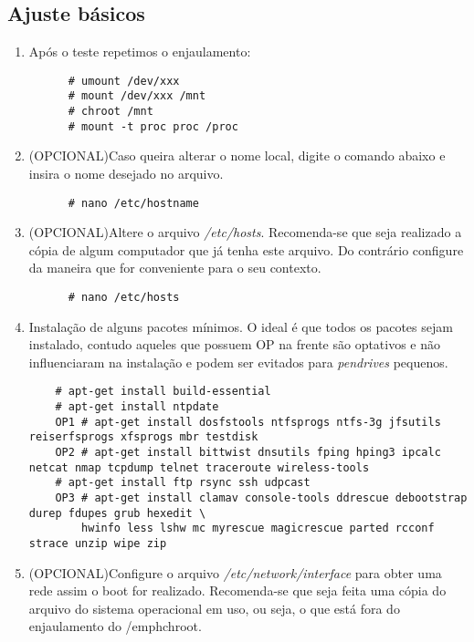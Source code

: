 \documentclass[a4paper,10pt]{article}
\begin{document}
  \subsection{Ajuste básicos}
    \begin{enumerate}
      \item Após o teste repetimos o enjaulamento:
	\begin{lstlisting}
	  # umount /dev/xxx
	  # mount /dev/xxx /mnt
	  # chroot /mnt
	  # mount -t proc proc /proc
	\end{lstlisting}

      \item (OPCIONAL)Caso queira alterar o nome local, digite o comando abaixo e insira o 
	  nome desejado no arquivo.
	\begin{lstlisting}
	  # nano /etc/hostname
	\end{lstlisting}

      \item (OPCIONAL)Altere o arquivo \emph{/etc/hosts}. Recomenda-se que seja realizado a cópia de 
	  algum computador que já tenha este arquivo. Do contrário configure da maneira que for 
	   conveniente para o seu contexto.
	\begin{lstlisting}
	  # nano /etc/hosts
	\end{lstlisting}

      \item Instalação de alguns pacotes mínimos. O ideal é que todos os pacotes sejam instalado, contudo 
	aqueles que possuem OP na frente são optativos e não influenciaram na instalação e podem ser evitados
	para \emph{pendrives} pequenos.
	\begin{lstlisting}
	# apt-get install build-essential
	# apt-get install ntpdate
	OP1 # apt-get install dosfstools ntfsprogs ntfs-3g jfsutils reiserfsprogs xfsprogs mbr testdisk
	OP2 # apt-get install bittwist dnsutils fping hping3 ipcalc netcat nmap tcpdump telnet traceroute wireless-tools
	# apt-get install ftp rsync ssh udpcast
	OP3 # apt-get install clamav console-tools ddrescue debootstrap durep fdupes grub hexedit \
	    hwinfo less lshw mc myrescue magicrescue parted rcconf strace unzip wipe zip
	\end{lstlisting}

      \item (OPCIONAL)Configure o arquivo \emph{/etc/network/interface} para obter uma rede assim o boot for realizado.
	Recomenda-se que seja feita uma cópia do arquivo do sistema operacional em uso, ou seja, o que 	
	está fora do enjaulamento do /emph{chroot}. 


\end{enumerate}
\end{document}
